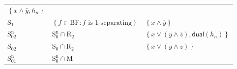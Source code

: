 \documentclass[10pt,a4paper]{article}
\newcommand{\ovl}{\overline}
\newcommand{\set}[1]{\left\{#1\right\}}
\newcommand{\dual}{\mathsf{dual}}
\newcommand{\clonefont}[1]{\mathrm{#1}}
\begin{document}
\begin{figure}[hbtp]
\begin{small}
\begin{longtable}[]{p{}p{}p{}}
\begin{minipage}[t]{0.38\columnwidth}
                \(\set{x \land \ovl{y} ,h_n}\)\strut
            \end{minipage}\tabularnewline
            \begin{minipage}[t]{0.12\columnwidth}\raggedright
                \(\clonefont{S_1}\)\strut
            \end{minipage} & \begin{minipage}[t]{0.41\columnwidth}\raggedright
                \(\set{f \in \clonefont{BF} : f \text{ is $1$-separating}}\)\strut
            \end{minipage} & \begin{minipage}[t]{0.38\columnwidth}\raggedright
                \(\set{x \land \ovl{y}}\)\strut
            \end{minipage}\tabularnewline
            \begin{minipage}[t]{0.12\columnwidth}\raggedright
                \(\clonefont{S_{02}^n}\)\strut
            \end{minipage} & \begin{minipage}[t]{0.41\columnwidth}\raggedright
                \(\clonefont{S_0^n} \cap \clonefont{R_2}\)\strut
            \end{minipage} & \begin{minipage}[t]{0.38\columnwidth}\raggedright
                \(\set{x \lor (y \land \ovl{z}), \dual(h_n)}\)\strut
            \end{minipage}\tabularnewline
            \begin{minipage}[t]{0.12\columnwidth}\raggedright
                \(\clonefont{S_{02}}\)\strut
            \end{minipage} & \begin{minipage}[t]{0.41\columnwidth}\raggedright
                \(\clonefont{S_0} \cap \clonefont{R_2}\)\strut
            \end{minipage} & \begin{minipage}[t]{0.38\columnwidth}\raggedright
                \(\set{x \lor (y \land \ovl{z})}\)\strut
            \end{minipage}\tabularnewline
            \begin{minipage}[t]{0.12\columnwidth}\raggedright
                \(\clonefont{S_{01}^n}\)\strut
            \end{minipage} & \begin{minipage}[t]{0.41\columnwidth}\raggedright
                \(\clonefont{S_0^n} \cap \clonefont{M}\)\strut
            \end{minipage} & \begin{minipage}[t]{0.38\columnwidth}\raggedright

\end{minipage}
\end{longtable}
\end{small}
\end{figure}
\end{document}

